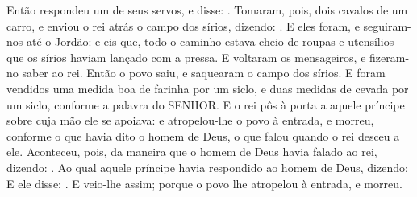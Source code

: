 {  Então respondeu um de seus servos, e disse: .
  Tomaram, pois, dois cavalos de um carro, e enviou o rei atrás o campo dos sírios, dizendo: .
  E eles foram, e seguiram-nos até o Jordão: e eis que, todo o caminho estava cheio de roupas e utensílios que os sírios haviam lançado com a pressa. E voltaram os mensageiros, e fizeram-no saber ao rei.
  Então o povo saiu, e saquearam o campo dos sírios. E foram vendidos uma medida boa de farinha por um siclo, e duas medidas de cevada por um siclo, conforme a palavra do SENHOR.
  E o rei pôs à porta a aquele príncipe sobre cuja mão ele se apoiava: e atropelou-lhe o povo à entrada, e morreu, conforme o que havia dito o homem de Deus, o que falou quando o rei desceu a ele.
  Aconteceu, pois, da maneira que o homem de Deus havia falado ao rei, dizendo: .
  Ao qual aquele príncipe havia respondido ao homem de Deus, dizendo:  E ele disse: .
  E veio-lhe assim; porque o povo lhe atropelou à entrada, e morreu.
\par }

